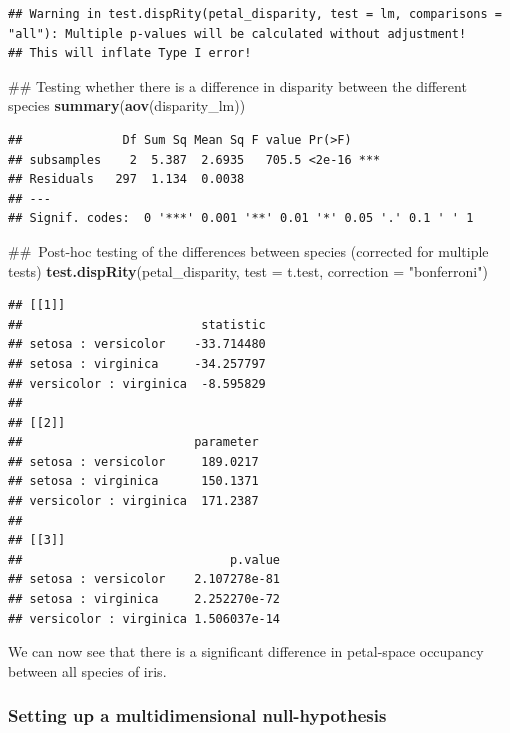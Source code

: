 \documentclass[]{book}
\newenvironment{Shaded}{\begin{snugshade}}{\end{snugshade}}
\newcommand{\KeywordTok}[1]{\textcolor[rgb]{0.13,0.29,0.53}{\textbf{#1}}}
\newcommand{\DataTypeTok}[1]{\textcolor[rgb]{0.13,0.29,0.53}{#1}}
\newcommand{\StringTok}[1]{\textcolor[rgb]{0.31,0.60,0.02}{#1}}
\newcommand{\NormalTok}[1]{#1}
\theoremstyle{definition}
\theoremstyle{definition}
\theoremstyle{remark}
\begin{document}
\begin{verbatim}
## Warning in test.dispRity(petal_disparity, test = lm, comparisons = "all"): Multiple p-values will be calculated without adjustment!
## This will inflate Type I error!
\end{verbatim}

\begin{Shaded}
\begin{Highlighting}[]
\NormalTok{## Testing whether there is a difference in disparity between the different species}
\KeywordTok{summary}\NormalTok{(}\KeywordTok{aov}\NormalTok{(disparity_lm))}
\end{Highlighting}
\end{Shaded}

\begin{verbatim}
##              Df Sum Sq Mean Sq F value Pr(>F)    
## subsamples    2  5.387  2.6935   705.5 <2e-16 ***
## Residuals   297  1.134  0.0038                   
## ---
## Signif. codes:  0 '***' 0.001 '**' 0.01 '*' 0.05 '.' 0.1 ' ' 1
\end{verbatim}

\begin{Shaded}
\begin{Highlighting}[]
\NormalTok{## Post-hoc testing of the differences between species (corrected for multiple tests)}
\KeywordTok{test.dispRity}\NormalTok{(petal_disparity, }\DataTypeTok{test =}\NormalTok{ t.test, }\DataTypeTok{correction =} \StringTok{"bonferroni"}\NormalTok{)}
\end{Highlighting}
\end{Shaded}

\begin{verbatim}
## [[1]]
##                         statistic
## setosa : versicolor    -33.714480
## setosa : virginica     -34.257797
## versicolor : virginica  -8.595829
## 
## [[2]]
##                        parameter
## setosa : versicolor     189.0217
## setosa : virginica      150.1371
## versicolor : virginica  171.2387
## 
## [[3]]
##                             p.value
## setosa : versicolor    2.107278e-81
## setosa : virginica     2.252270e-72
## versicolor : virginica 1.506037e-14
\end{verbatim}

We can now see that there is a significant difference in petal-space
occupancy between all species of iris.

\subsubsection{Setting up a multidimensional
null-hypothesis}\label{setting-up-a-multidimensional-null-hypothesis}
\end{document}
